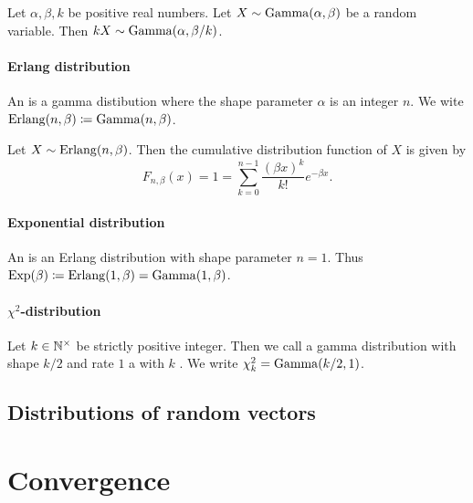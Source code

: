 \begin{lemma}
Let $\alpha,\beta, k$ be positive real numbers. Let $X \sim \operatorname{Gamma}(\alpha, \beta)$ be a random variable. Then $kX \sim \operatorname{Gamma}(\alpha, \beta / k)$.
\end{lemma}

\subsubsection{Erlang distribution}
\begin{definition}
An  is a gamma distibution where the shape parameter $\alpha$ is an integer $n$. We wite $\operatorname{Erlang}(n, \beta) \coloneqq \operatorname{Gamma}(n, \beta)$.
\end{definition}

\begin{proposition} \label{ErlangCDF}
Let $X \sim \operatorname{Erlang}(n, \beta)$. Then the cumulative distribution function of $X$ is given by
\[ F_{n,\beta}(x) = 1 = \sum_{k=0}^{n-1} \frac{(\beta x)^k}{k!}e^{-\beta x}. \]
\end{proposition}

\subsubsection{Exponential distribution}
\begin{definition}
An  is an Erlang distribution with shape parameter $n = 1$. Thus $\operatorname{Exp}(\beta) \coloneqq \operatorname{Erlang}(1,\beta) = \operatorname{Gamma}(1, \beta)$.
\end{definition}

\subsubsection{$\chi^2$-distribution}
\begin{definition}
Let $k\in \mathbb{N}^\times$ be strictly positive integer. Then we call a gamma distribution with shape $k/2$ and rate $1$ a  with $k$ . We write $\chi^2_k = \operatorname{Gamma}(k/2, 1)$.
\end{definition}

\section{Distributions of random vectors}

\chapter{Convergence}
